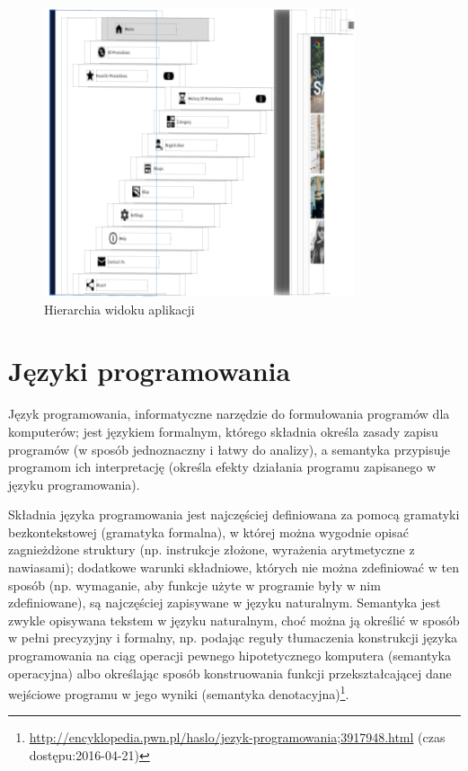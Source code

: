 \documentclass{iiuwb}
\begin{document}
 \begin{figure}[!th]
\centering
\includegraphics[scale=.5]{image/XcodeViewHierarchy.png}
\caption{Hierarchia widoku aplikacji}
\label{fig:XcodeViewHierarchy}
\end{figure}
\section{Języki programowania}
Język programowania, informatyczne narzędzie do formułowania programów dla komputerów; jest językiem formalnym, którego składnia określa zasady zapisu programów (w sposób jednoznaczny i łatwy do analizy), a semantyka przypisuje programom ich interpretację (określa efekty działania programu zapisanego w języku programowania).

Składnia języka programowania jest najczęściej definiowana za pomocą gramatyki bezkontekstowej (gramatyka formalna), w której można wygodnie opisać zagnieżdżone struktury (np. instrukcje złożone, wyrażenia arytmetyczne z nawiasami); dodatkowe warunki składniowe, których nie można zdefiniować w ten sposób (np. wymaganie, aby funkcje użyte w programie były w nim zdefiniowane), są najczęściej zapisywane w języku naturalnym. Semantyka jest zwykle opisywana tekstem w języku naturalnym, choć można ją określić w sposób w pełni precyzyjny i formalny, np. podając reguły tłumaczenia konstrukcji języka programowania na ciąg operacji pewnego hipotetycznego komputera (semantyka operacyjna) albo określając sposób konstruowania funkcji przekształcającej dane wejściowe programu w jego wyniki (semantyka denotacyjna)\footnote{\url{http://encyklopedia.pwn.pl/haslo/jezyk-programowania;3917948.html} (czas dostępu:2016-04-21)}. 
\end{document}
